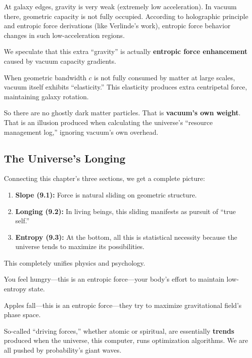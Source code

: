\documentclass[11pt,a4paper,twoside]{book}
\begin{document}
At galaxy edges, gravity is very weak (extremely low acceleration). In vacuum there, geometric capacity is not fully occupied. According to holographic principle and entropic force derivations (like Verlinde's work), entropic force behavior changes in such low-acceleration regions.

We speculate that this extra ``gravity'' is actually \textbf{entropic force enhancement} caused by vacuum capacity gradients.

When geometric bandwidth $c$ is not fully consumed by matter at large scales, vacuum itself exhibits ``elasticity.'' This elasticity produces extra centripetal force, maintaining galaxy rotation.

So there are no ghostly dark matter particles. That is \textbf{vacuum's own weight}. That is an illusion produced when calculating the universe's ``resource management log,'' ignoring vacuum's own overhead.

\subsection{The Universe's Longing}

Connecting this chapter's three sections, we get a complete picture:

\begin{enumerate}
\item \textbf{Slope (9.1):} Force is natural sliding on geometric structure.

\item \textbf{Longing (9.2):} In living beings, this sliding manifests as pursuit of ``true self.''

\item \textbf{Entropy (9.3):} At the bottom, all this is statistical necessity because the universe tends to maximize its possibilities.
\end{enumerate}

This completely unifies physics and psychology.

You feel hungry---this is an entropic force---your body's effort to maintain low-entropy state.

Apples fall---this is an entropic force---they try to maximize gravitational field's phase space.

So-called ``driving forces,'' whether atomic or spiritual, are essentially \textbf{trends} produced when the universe, this computer, runs optimization algorithms. We are all pushed by probability's giant waves.
\end{document}
